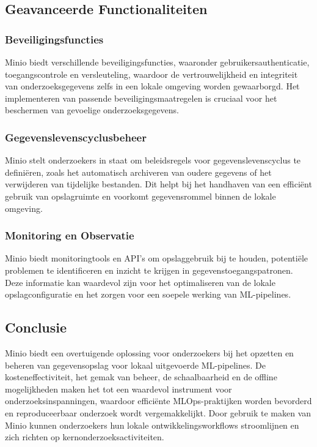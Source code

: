 \subsection{Geavanceerde Functionaliteiten}

\subsubsection{Beveiligingsfuncties}
Minio biedt verschillende beveiligingsfuncties, waaronder gebruikersauthenticatie, toegangscontrole en versleuteling, waardoor de vertrouwelijkheid en integriteit van onderzoeksgegevens zelfs in een lokale omgeving worden gewaarborgd. Het implementeren van passende beveiligingsmaatregelen is cruciaal voor het beschermen van gevoelige onderzoeksgegevens.

\subsubsection{Gegevenslevenscyclusbeheer}
Minio stelt onderzoekers in staat om beleidsregels voor gegevenslevenscyclus te definiëren, zoals het automatisch archiveren van oudere gegevens of het verwijderen van tijdelijke bestanden. Dit helpt bij het handhaven van een efficiënt gebruik van opslagruimte en voorkomt gegevensrommel binnen de lokale omgeving.

\subsubsection{Monitoring en Observatie}
Minio biedt monitoringtools en API's om opslaggebruik bij te houden, potentiële problemen te identificeren en inzicht te krijgen in gegevenstoegangspatronen. Deze informatie kan waardevol zijn voor het optimaliseren van de lokale opslagconfiguratie en het zorgen voor een soepele werking van ML-pipelines.

\subsection{Conclusie}

Minio biedt een overtuigende oplossing voor onderzoekers bij het opzetten en beheren van gegevensopslag voor lokaal uitgevoerde ML-pipelines. De kosteneffectiviteit, het gemak van beheer, de schaalbaarheid en de offline mogelijkheden maken het tot een waardevol instrument voor onderzoeksinspanningen, waardoor efficiënte MLOps-praktijken worden bevorderd en reproduceerbaar onderzoek wordt vergemakkelijkt. Door gebruik te maken van Minio kunnen onderzoekers hun lokale ontwikkelingsworkflows stroomlijnen en zich richten op kernonderzoeksactiviteiten.

